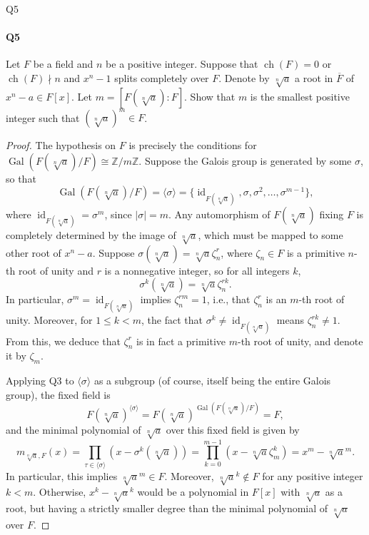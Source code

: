 \documentclass[12pt]{article}
\newenvironment{fullbox}{\begin{lrbox}{\savefullbox}\begin{minipage}{\dimexpr\textwidth-2\fboxsep\relax}}{\end{minipage}\end{lrbox}\begin{center}\framebox[\textwidth]{\usebox{\savefullbox}}\end{center}}
\newenvironment{pbox}[1][]{\begin{fullbox}\ifx#1\empty\else\paragraph{#1}\fi}{\end{fullbox}}
\newcommand{\Z}{\mathbb{Z}}
\newcommand{\<}{\langle}
\renewcommand{\>}{\rangle}
\newcommand{\isom}{\cong}
\newcommand{\clo}{\overline}
\DeclareMathOperator{\id}{id}
\DeclareMathOperator{\Gal}{Gal}
\begin{document}
\newpage
\begin{pbox}[Q5]
    Let $F$ be a field and $n$ be a positive integer. Suppose that $\operatorname{ch}(F) = 0$ or $\operatorname{ch}(F)\nmid n$ and $x^n-1$ splits completely over $F$. Denote by $\sqrt[n]{a}$ a root in $\clo{F}$ of $x^n - a \in F[x]$. Let $m = [F(\sqrt[n]{a}) : F]$. Show that $m$ is the smallest positive integer such that $(\sqrt[n]{a})^m \in F$.
\end{pbox}


\begin{proof}
    The hypothesis on $F$ is precisely the conditions for $\Gal(F(\sqrt[n]{a})/F) \isom \Z/m\Z$. Suppose the Galois group is generated by some $\sigma$, so that
    \[
        \Gal(F(\sqrt[n]{a})/F) = \<\sigma\> = \{\id_{F(\sqrt[n]{a})}, \sigma, \sigma^2, \dots, \sigma^{m-1}\},
    \]
    where $\id_{F(\sqrt[n]{a})} = \sigma^m$, since $|\sigma| = m$. Any automorphism of $F(\sqrt[n]{a})$ fixing $F$ is completely determined by the image of $\sqrt[n]{a}$, which must be mapped to some other root of $x^n - a$. Suppose $\sigma(\sqrt[n]{a}) = \sqrt[n]{a}\zeta_n^r$, where $\zeta_n \in F$ is a primitive $n$-th root of unity and $r$ is a nonnegative integer, so for all integers $k$, 
    \[
        \sigma^k(\sqrt[n]{a}) = \sqrt[n]{a}\zeta_n^{rk}.
    \]
    In particular, $\sigma^m = \id_{F(\sqrt[n]{a})}$ implies $\zeta_n^{rm} = 1$, i.e., that $\zeta_n^r$ is an $m$-th root of unity. Moreover, for $1 \leq k < m$, the fact that $\sigma^k \ne \id_{F(\sqrt[n]{a})}$ means $\zeta_n^{rk} \ne 1$. From this, we deduce that $\zeta_n^r$ is in fact a primitive $m$-th root of unity, and denote it by $\zeta_m$. 
    
    Applying Q3 to $\<\sigma\>$ as a subgroup (of course, itself being the entire Galois group), the fixed field is
    \[
        F(\sqrt[n]{a})^{\<\sigma\>} = F(\sqrt[n]{a})^{\Gal(F(\sqrt[n]{a})/F)} = F,
    \]
    and the minimal polynomial of $\sqrt[n]{a}$ over this fixed field is given by
    \[
        m_{\sqrt[n]{a}, F}(x)
            = \prod_{\tau \in \<\sigma\>} (x - \sigma^k(\sqrt[n]{a}))
            = \prod_{k=0}^{m-1} (x - \sqrt[n]{a}\zeta_m^k) = x^m - \sqrt[n]{a}^m.
    \]
    In particular, this implies $\sqrt[n]{a}^m \in F$. Moreover, $\sqrt[n]{a}^k \notin F$ for any positive integer $k < m$. Otherwise, $x^k - \sqrt[n]{a}^k$ would be a polynomial in $F[x]$ with $\sqrt[n]{a}$ as a root, but having a strictly smaller degree than the minimal polynomial of $\sqrt[n]{a}$ over $F$.

\end{proof}
\end{document}
